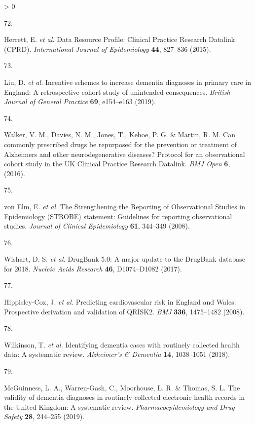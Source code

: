 \documentclass[a4paper, twoside]{templates/ociamthesis}
\newlength{\cslhangindent}
\newlength{\csllabelwidth}
\newenvironment{CSLReferences}[3] %
 {%
  \setlength{\parindent}{0pt}
  \ifodd #1 \everypar{\setlength{\hangindent}{\cslhangindent}}\ignorespaces\fi
  \ifnum #2 > 0
  \setlength{\parskip}{#2\baselineskip}
  \fi
 }%
 {}
\newcommand{\CSLLeftMargin}[1]{\parbox[t]{\maxof{\widthof{#1}}{\csllabelwidth}}{#1}}
\newcommand{\CSLRightInline}[1]{\parbox[t]{\linewidth - \csllabelwidth}{#1}}
\begin{document}
\begin{CSLReferences}{0}{0}
\leavevmode\hypertarget{ref-herrett2015}{}%
\CSLLeftMargin{72. }
\CSLRightInline{Herrett, E. \emph{et al.} Data {Resource Profile}: {Clinical Practice Research Datalink} ({CPRD}). \emph{International Journal of Epidemiology} \textbf{44}, 827--836 (2015).}

\leavevmode\hypertarget{ref-liu2019}{}%
\CSLLeftMargin{73. }
\CSLRightInline{Liu, D. \emph{et al.} Incentive schemes to increase dementia diagnoses in primary care in {England}: A retrospective cohort study of unintended consequences. \emph{British Journal of General Practice} \textbf{69}, e154--e163 (2019).}

\leavevmode\hypertarget{ref-walker2016a}{}%
\CSLLeftMargin{74. }
\CSLRightInline{Walker, V. M., Davies, N. M., Jones, T., Kehoe, P. G. \& Martin, R. M. Can commonly prescribed drugs be repurposed for the prevention or treatment of {Alzheimers} and other neurodegenerative diseases? {Protocol} for an observational cohort study in the {UK Clinical Practice Research Datalink}. \emph{BMJ Open} \textbf{6}, (2016).}

\leavevmode\hypertarget{ref-vonelm2008}{}%
\CSLLeftMargin{75. }
\CSLRightInline{von Elm, E. \emph{et al.} The {Strengthening} the {Reporting} of {Observational Studies} in {Epidemiology} ({STROBE}) statement: Guidelines for reporting observational studies. \emph{Journal of Clinical Epidemiology} \textbf{61}, 344--349 (2008).}

\leavevmode\hypertarget{ref-wishart2017}{}%
\CSLLeftMargin{76. }
\CSLRightInline{Wishart, D. S. \emph{et al.} {DrugBank} 5.0: A major update to the {DrugBank} database for 2018. \emph{Nucleic Acids Research} \textbf{46}, D1074--D1082 (2017).}

\leavevmode\hypertarget{ref-hippisley-cox2008}{}%
\CSLLeftMargin{77. }
\CSLRightInline{Hippisley-Cox, J. \emph{et al.} Predicting cardiovascular risk in {England} and {Wales}: Prospective derivation and validation of {QRISK2}. \emph{BMJ} \textbf{336}, 1475--1482 (2008).}

\leavevmode\hypertarget{ref-wilkinson2018a}{}%
\CSLLeftMargin{78. }
\CSLRightInline{Wilkinson, T. \emph{et al.} Identifying dementia cases with routinely collected health data: {A} systematic review. \emph{Alzheimer's \& Dementia} \textbf{14}, 1038--1051 (2018).}

\leavevmode\hypertarget{ref-mcguinness2019c}{}%
\CSLLeftMargin{79. }
\CSLRightInline{McGuinness, L. A., Warren-Gash, C., Moorhouse, L. R. \& Thomas, S. L. The validity of dementia diagnoses in routinely collected electronic health records in the {United Kingdom}: {A} systematic review. \emph{Pharmacoepidemiology and Drug Safety} \textbf{28}, 244--255 (2019).}


\end{CSLReferences}
\end{document}
